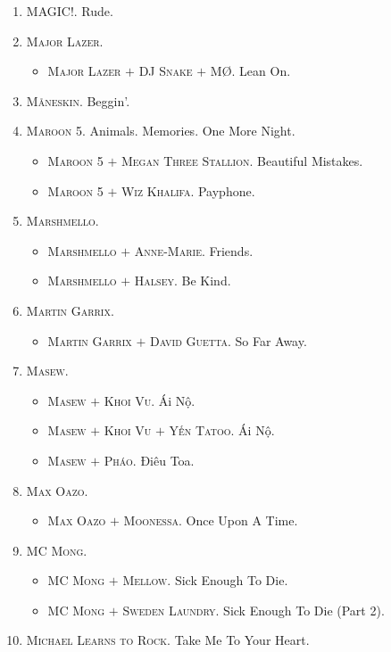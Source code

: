\documentclass[oneside]{book}
\numberwithin{equation}{section}
\begin{document}
\begin{enumerate}
	\item \textsc{MAGIC!.} Rude.
	\item \textsc{Major Lazer.}
	\begin{itemize}
		\item \textsc{Major Lazer $+$ DJ Snake $+$ M\O.} Lean On.
	\end{itemize}
	\item \textsc{M\r{a}neskin.} Beggin'.
	\item \textsc{Maroon 5.} Animals. Memories. One More Night.
	\begin{itemize}
		\item \textsc{Maroon 5 $+$ Megan Three Stallion.} Beautiful Mistakes.
		\item \textsc{Maroon 5 $+$ Wiz Khalifa.} Payphone.
	\end{itemize}
	\item \textsc{Marshmello.}
	\begin{itemize}
		\item \textsc{Marshmello $+$ Anne-Marie.} Friends.
		\item \textsc{Marshmello $+$ Halsey.} Be Kind.
	\end{itemize}
	\item \textsc{Martin Garrix.}
	\begin{itemize}
		\item \textsc{Martin Garrix $+$ David Guetta.} So Far Away.
	\end{itemize}
	\item \textsc{Masew.}
	\begin{itemize}
		\item \textsc{Masew $+$ Khoi Vu.} Ái Nộ.
		\item \textsc{Masew $+$ Khoi Vu $+$ Yến Tatoo.} Ái Nộ.
		\item \textsc{Masew $+$ Pháo.} Điêu Toa.
	\end{itemize}
	\item \textsc{Max Oazo.}
	\begin{itemize}
		\item \textsc{Max Oazo $+$ Moonessa.} Once Upon A Time.
	\end{itemize}
	\item \textsc{MC Mong.}
	\begin{itemize}
		\item \textsc{MC Mong $+$ Mellow.} Sick Enough To Die.
		\item \textsc{MC Mong $+$ Sweden Laundry.} Sick Enough To Die (Part 2).
	\end{itemize}
	\item \textsc{Michael Learns to Rock.} Take Me To Your Heart.

\end{enumerate}
\end{document}
